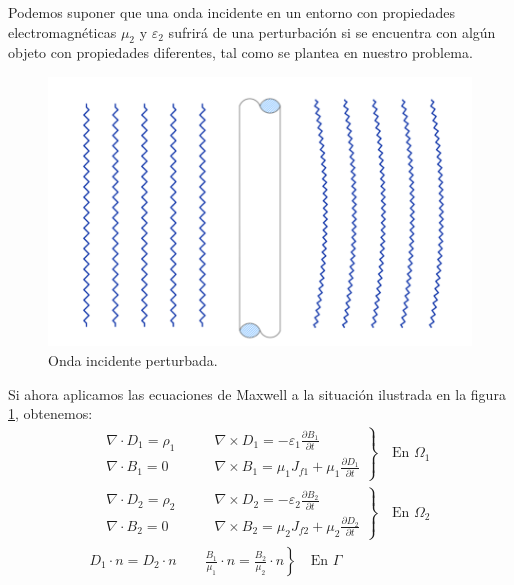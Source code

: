 Podemos suponer que una onda incidente en un entorno con propiedades electromagnéticas $\mu_2$ y $\varepsilon_2$ sufrirá de una perturbación si se encuentra con algún objeto con propiedades diferentes, tal como se plantea en nuestro problema.
\begin{figure}[H]
\centering
\includegraphics[width=16cm]{Imagenes/ondaincidente3.png}
\caption{Onda incidente perturbada.}\label{fig:Onda perturbada}
\end{figure}
Si ahora aplicamos las ecuaciones de Maxwell a la situación ilustrada en la figura \ref{fig:Onda perturbada}, obtenemos:
\begin{equation}
\label{eq:Onda perturbada}
\begin{split}
\left.
\begin{aligned}
&\nabla\cdot D_1 = \rho_1\qquad & \nabla\times D_1 = -\varepsilon_1\frac{\partial B_1}{\partial t}\\
&\nabla\cdot B_1 = 0\qquad & \nabla\times B_1 = \mu_1 J_{f1}+\mu_1\frac{\partial D_1}{\partial t}
\end{aligned}
\right\}
\quad\text{En }\Omega_1\\
\left.
\begin{aligned}
&\nabla\cdot D_2 = \rho_2\qquad & \nabla\times D_2 = -\varepsilon_2\frac{\partial B_2}{\partial t}\\
&\nabla\cdot B_2 = 0\qquad & \nabla\times B_2 = \mu_2 J_{f2}+\mu_2\frac{\partial D_2}{\partial t}
\end{aligned}
\right\}
\quad\text{En }\Omega_2\\
\left. 
D_1\cdot n=D_2\cdot n \qquad \frac{B_1}{\mu_1}\cdot n=\frac{B_2}{\mu_2}\cdot n
\right\}
\quad\text{En }\Gamma\\
\end{split}
\end{equation}
